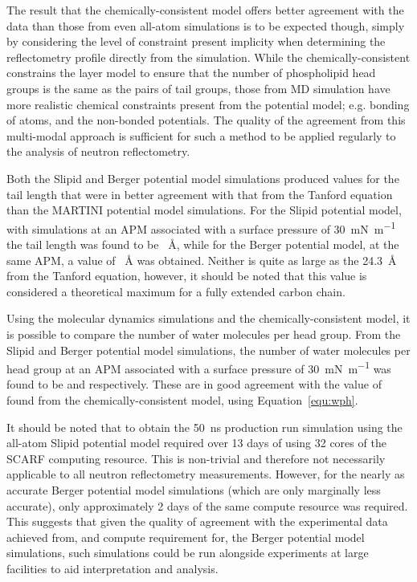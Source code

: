 The result that the chemically-consistent model offers better agreement with the data than those from even all-atom simulations is to be expected though, simply by considering the level of constraint present implicity when determining the reflectometry profile directly from the simulation.
While the chemically-consistent constrains the layer model to ensure that the number of phospholipid head groups is the same as the pairs of tail groups, those from MD simulation have more realistic chemical constraints present from the potential model; e.g. bonding of atoms, and the non-bonded potentials.
The quality of the agreement from this multi-modal approach is sufficient for such a method to be applied regularly to the analysis of neutron reflectometry.

Both the Slipid and Berger potential model simulations produced values for the tail length that were in better agreement with that from the Tanford equation than the MARTINI potential model simulations.
For the Slipid potential model, with simulations at an APM associated with a surface pressure of \SI{30}{\milli\newton\per\meter} the tail length was found to be ~\si{\angstrom}, while for the Berger potential model, at the same APM, a value of ~\si{\angstrom} was obtained.
Neither is quite as large as the \SI{24.3}{\angstrom} from the Tanford equation, however, it should be noted that this value is considered a theoretical maximum for a fully extended carbon chain.

Using the molecular dynamics simulations and the chemically-consistent model, it is possible to compare the number of water molecules per head group.
From the Slipid and Berger potential model simulations, the number of water molecules per head group at an APM associated with a surface pressure of \SI{30}{\milli\newton\per\meter} was found to be  and  respectively.
These are in good agreement with the value of  found from the chemically-consistent model, using Equation~\ref{equ:wph}.

It should be noted that to obtain the \SI{50}{\nano\second} production run simulation using the all-atom Slipid potential model required over 13 days of using 32 cores of the SCARF computing resource.
This is non-trivial and therefore not necessarily applicable to all neutron reflectometry measurements.
However, for the nearly as accurate Berger potential model simulations (which are only marginally less accurate), only approximately 2 days of the same compute resource was required.
This suggests that given the quality of agreement with the experimental data achieved from, and compute requirement for, the Berger potential model simulations, such simulations could be run alongside experiments at large facilities to aid interpretation and analysis.

